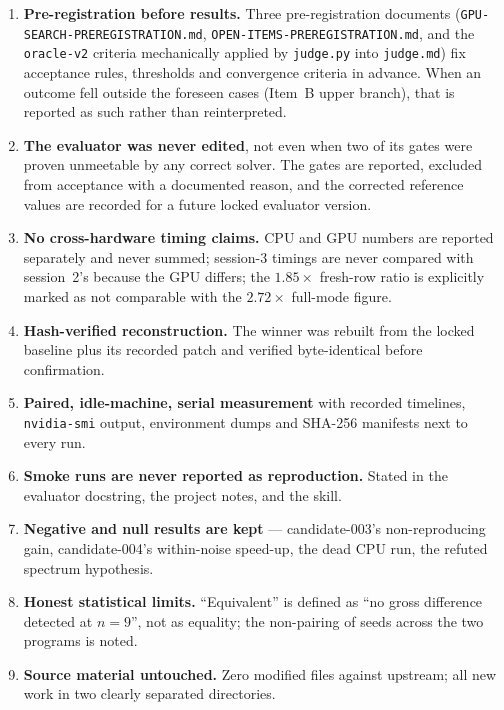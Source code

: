 \documentclass[11pt,a4paper]{article}
\newcommand{\code}[1]{\texttt{\small #1}}
\begin{document}
\begin{enumerate}[leftmargin=1.4em,itemsep=2pt]
  \item \textbf{Pre-registration before results.} Three pre-registration documents
        (\code{GPU-SEARCH-PREREGISTRATION.md}, \code{OPEN-ITEMS-PREREGISTRATION.md}, and the
        \code{oracle-v2} criteria mechanically applied by \code{judge.py} into
        \code{judge.md}) fix acceptance rules, thresholds and convergence criteria in
        advance. When an outcome fell outside the foreseen cases (Item~B upper branch), that
        is reported as such rather than reinterpreted.
  \item \textbf{The evaluator was never edited}, not even when two of its gates were proven
        unmeetable by any correct solver. The gates are reported, excluded from acceptance
        with a documented reason, and the corrected reference values are recorded for a
        future locked evaluator version.
  \item \textbf{No cross-hardware timing claims.} CPU and GPU numbers are reported
        separately and never summed; session-3 timings are never compared with session~2's
        because the GPU differs; the $1.85\times$ fresh-row ratio is explicitly marked as
        not comparable with the $2.72\times$ full-mode figure.
  \item \textbf{Hash-verified reconstruction.} The winner was rebuilt from the locked
        baseline plus its recorded patch and verified byte-identical before confirmation.
  \item \textbf{Paired, idle-machine, serial measurement} with recorded timelines,
        \code{nvidia-smi} output, environment dumps and SHA-256 manifests next to every run.
  \item \textbf{Smoke runs are never reported as reproduction.} Stated in the evaluator
        docstring, the project notes, and the skill.
  \item \textbf{Negative and null results are kept} --- candidate-003's non-reproducing
        gain, candidate-004's within-noise speed-up, the dead CPU run, the refuted
        spectrum hypothesis.
  \item \textbf{Honest statistical limits.} ``Equivalent'' is defined as ``no gross
        difference detected at $n=9$'', not as equality; the non-pairing of seeds across the
        two programs is noted.
  \item \textbf{Source material untouched.} Zero modified files against upstream; all new
        work in two clearly separated directories.
\end{enumerate}
\end{document}
